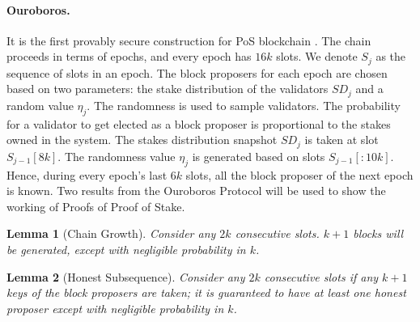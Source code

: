\documentclass[a4paper,11pt,oneside]{article}
\newtheorem{lemma}{Lemma}
\theoremstyle{definition}
\begin{document}
  \paragraph{Ouroboros.}  It is the first provably secure construction for PoS blockchain \cite{Ouroboros}. The chain proceeds in terms of epochs, and every epoch has $16k$ slots. We denote $S_j$ as the sequence of slots in an epoch. The block proposers for each epoch are chosen based on two parameters: the stake distribution of the validators $SD_j$ and a random value ${\eta}_j$. The randomness is used to sample validators. The probability for a validator to get elected as a block proposer is proportional to the stakes owned in the system. The stakes distribution snapshot $SD_j$ is taken at slot $S_{j - 1}[8k]$. The randomness value ${\eta}_j$ is generated based on slots $S_{j - 1}[:10k]$. Hence, during every epoch's last $6k$ slots, all the block proposer of the next epoch is known. Two results from the Ouroboros Protocol will be used to show the working of Proofs of Proof of Stake.
  
  \begin{lemma}[Chain Growth]
  \label{ChainGrowth}
  Consider any $2k$ consecutive slots. $k+1$ blocks will be generated, except with negligible probability in $k$. 
  \end{lemma}
  
  \begin{lemma}[Honest Subsequence]
  \label{HonestSubsequence}
  Consider any $2k$ consecutive slots if any $k+1$ keys of the block proposers are taken; it is guaranteed to have at least one honest proposer except with negligible probability in $k$. 
  \end{lemma}
  
\end{document}
